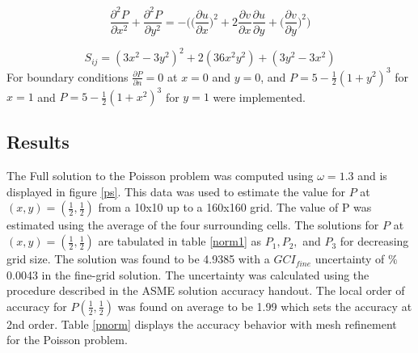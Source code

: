 \documentclass[paper=a4, fontsize=11pt, abstract=on]{scrartcl}
\numberwithin{equation}{section}		%
\numberwithin{figure}{section}			%
\numberwithin{table}{section}				%
\begin{document}
\begin{equation}
\label{d3}
\frac{\partial^2P}{\partial x^2} + \frac{\partial^2P}{\partial y^2} = -\Bigg(\Bigg(\frac{\partial u}{\partial x}\Bigg)^2 +2\frac{\partial v}{\partial x}\frac{\partial u}{\partial y}        +\Bigg(\frac{\partial v}{\partial y}\Bigg)^2\Bigg)
\end{equation}

\begin{equation}
\label{d4}
S_{ij} = (3x^2-3y^2)^2+2(36x^2y^2)+(3y^2-3x^2)
\end{equation}
For boundary conditions $\frac{\partial P}{\partial n}=0$ at $x=0$ and $y=0$, and $P=5-\frac{1}{2}(1+y^2)^3$ for $x=1$ and $P=5-\frac{1}{2}(1+x^2)^3$ for $y=1$ were implemented. 



\subsection{Results}
The Full solution to the Poisson problem was computed using $\omega=1.3$ and is displayed in figure \ref{ps}. This data was used to estimate the value for $P$ at $(x,y) = (\frac{1}{2},\frac{1}{2})$ from a 10x10  up to a 160x160 grid. The value of P was estimated using the average of the four surrounding cells. The solutions for $P$ at $(x,y) = (\frac{1}{2},\frac{1}{2})$ are tabulated in table \ref{norm1} as $P_1, P_2,$ and $P_3$ for decreasing grid size. The solution was found to be 4.9385 with a $GCI_{fine}$ uncertainty of $\%$0.0043 in the fine-grid solution. The uncertainty was calculated using the procedure described in the ASME solution accuracy handout.\cite{p0} The local order of accuracy for $P(\frac{1}{2},\frac{1}{2})$ was found on average to be 1.99 which sets the accuracy at 2nd order. Table \ref{pnorm} displays the accuracy behavior with mesh refinement for the Poisson problem.
\end{document}
